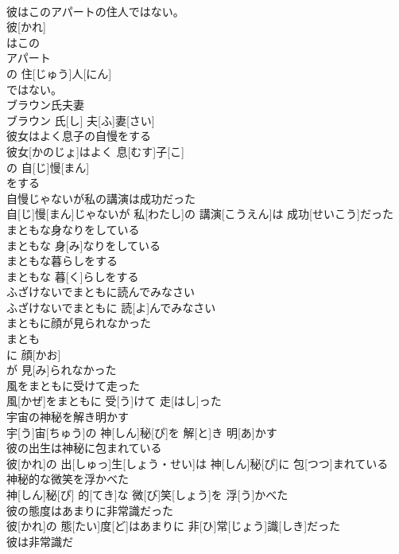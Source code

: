 \documentclass[8pt]{extreport}
\begin{document}
\begin{CJK}{UTF8}{min}
\\	彼はこのアパートの住人ではない。	
\\	彼[かれ]
\\	はこの 
\\	アパート 
\\	の 住[じゅう]人[にん]
\\	ではない。
\\	ブラウン氏夫妻	
\\	ブラウン 氏[し] 夫[ふ]妻[さい]
\\	彼女はよく息子の自慢をする	
\\	彼女[かのじょ]はよく 息[むす]子[こ]
\\	の 自[じ]慢[まん]
\\	をする
\\	自慢じゃないが私の講演は成功だった	
\\	自[じ]慢[まん]じゃないが 私[わたし]の 講演[こうえん]は 成功[せいこう]だった
\\	まともな身なりをしている	
\\	まともな 身[み]なりをしている
\\	まともな暮らしをする	
\\	まともな 暮[く]らしをする
\\	ふざけないでまともに読んでみなさい	
\\	ふざけないでまともに 読[よ]んでみなさい
\\	まともに顔が見られなかった	
\\	まとも 
\\	に 顔[かお]
\\	が 見[み]られなかった 
\\	風をまともに受けて走った	
\\	風[かぜ]をまともに 受[う]けて 走[はし]った
\\	宇宙の神秘を解き明かす	
\\	宇[う]宙[ちゅう]の 神[しん]秘[ぴ]を 解[と]き 明[あ]かす
\\	彼の出生は神秘に包まれている	
\\	彼[かれ]の 出[しゅっ]生[しょう・せい]は 神[しん]秘[ぴ]に 包[つつ]まれている
\\	神秘的な微笑を浮かべた	
\\	神[しん]秘[ぴ] 的[てき]な 微[び]笑[しょう]を 浮[う]かべた
\\	彼の態度はあまりに非常識だった	
\\	彼[かれ]の 態[たい]度[ど]はあまりに 非[ひ]常[じょう]識[しき]だった
\\	彼は非常識だ	

\end{CJK}
\end{document}
